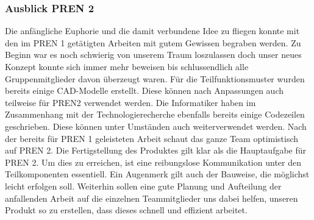 \subsubsection{Ausblick PREN 2}
Die anfängliche Euphorie und die damit verbundene Idee zu fliegen konnte mit den im PREN 1 getätigten Arbeiten mit gutem Gewissen begraben werden. Zu Beginn war es noch schwierig von unserem Traum loszulassen doch unser neues Konzept konnte sich immer mehr beweisen bis schlussendlich alle Gruppenmitglieder davon überzeugt waren.
Für die Teilfunktionsmuster wurden bereits einige CAD-Modelle erstellt. Diese können nach Anpassungen auch teilweise für PREN2 verwendet werden. Die Informatiker haben im Zusammenhang mit der Technologierecherche ebenfalls bereits einige Codezeilen geschrieben. Diese können unter Umständen auch weiterverwendet werden.
Nach der bereits für PREN 1 geleisteten Arbeit schaut das ganze Team optimistisch auf PREN 2. Die Fertigstellung des Produktes gilt klar als die Hauptaufgabe für PREN 2. Um dies zu erreichen, ist eine reibungslose Kommunikation unter den Teilkomponenten essentiell. Ein Augenmerk gilt auch der Bauweise, die möglichst leicht erfolgen soll. Weiterhin sollen eine gute Planung und Aufteilung der anfallenden Arbeit auf die einzelnen Teammitglieder uns dabei helfen, unseren Produkt so zu erstellen, dass dieses schnell und effizient arbeitet.
